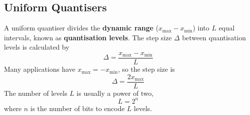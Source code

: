 \documentclass{article}
\begin{document}
\subsection{Uniform Quantisers}
A uniform quantiser divides the \textbf{dynamic range} (\(x_\mathrm{max} - x_\mathrm{min}\)) into \(L\) equal intervals,
known as \textbf{quantisation levels}.
The step size \(\Delta\) between quantisation levels is calculated by
\begin{equation*}
    \Delta = \frac{x_\mathrm{max} - x_\mathrm{min}}{L}
\end{equation*}
Many applications have \(x_\mathrm{max} = -x_\mathrm{min}\), so the step size is
\begin{equation*}
    \Delta = \frac{2 x_\mathrm{max}}{L}
\end{equation*}
The number of levels \(L\) is usually a power of two,
\begin{equation*}
    L = 2^n
\end{equation*}
where \(n\) is the number of bits to encode \(L\) levels.
\end{document}

